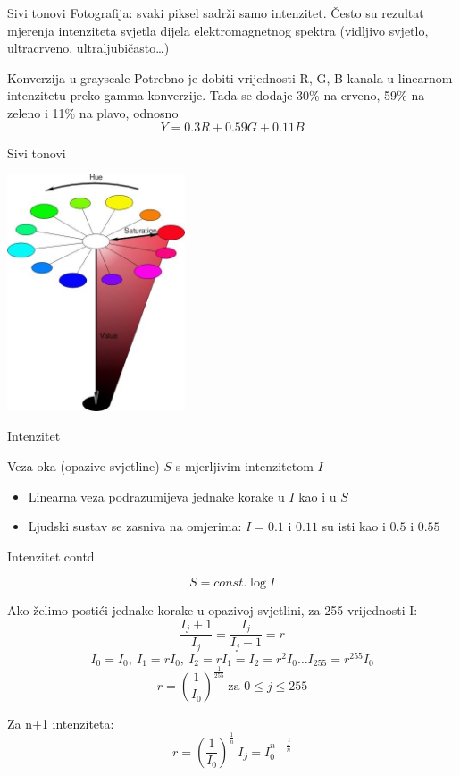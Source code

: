 \documentclass[9pt]{beamer}
\begin{document}
\begin{frame}{Sivi tonovi}
	Fotografija: svaki piksel sadrži samo intenzitet. Često su rezultat mjerenja intenziteta svjetla  dijela elektromagnetnog spektra 
	(vidljivo svjetlo, ultracrveno, ultraljubičasto\ldots)
	\begin{block}{Konverzija u grayscale}
		Potrebno je dobiti vrijednosti R, G, B kanala u linearnom intenzitetu preko gamma konverzije. Tada se dodaje 30\% na crveno, 
		59\% na zeleno i 11\% na plavo, odnosno \[Y = 0.3R + 0.59G + 0.11B\]
	\end{block}
\end{frame}

\begin{frame}{Sivi tonovi}
	\begin{center}
		\includegraphics[height=7cm]{slike/07_hexacone-5.png}
	\end{center}
\end{frame}


\begin{frame}{Intenzitet}
	
	
	\begin{block}{Veza oka (opazive svjetline)  $S$ s mjerljivim intenzitetom $I$}
		\begin{itemize}
			\item Linearna veza podrazumijeva jednake korake u $I$ kao i u $S$
			\item Ljudski sustav se zasniva na omjerima: $I=0.1$ i $0.11$ su isti kao i $0.5$ i $0.55$
		\end{itemize}
	\end{block}
\end{frame}
\begin{frame}{Intenzitet contd.}
	
	\[S = const. \log{I}\]
	
	
	Ako želimo postići jednake korake u opazivoj svjetlini, za 255 vrijednosti I:
	\[\frac{I_{j}+1}{I_{j}}=\frac{I_{j}}{I_{j}-1}=r\]
	\[I_{0}=I_{0},\ I_{1}=rI_{0}, \ I_{2}=rI_{1}=I_{2}=r^{2}I_{0}\ldots I_{255}=r^{255}I_{0}\]
	\[r=\left (\frac{1}{I_{0}}\right )^{\frac{1}{255}}\ \textrm{za } 0\leq j \leq 255\]
	
	Za n+1 intenziteta:
	\[r=\left (\frac{1}{I_{0}}\right )^{\frac{1}{n}}\ I_{j}=I_{0}^{n-\frac{j}{n}}\]
\end{frame}
\end{document}
